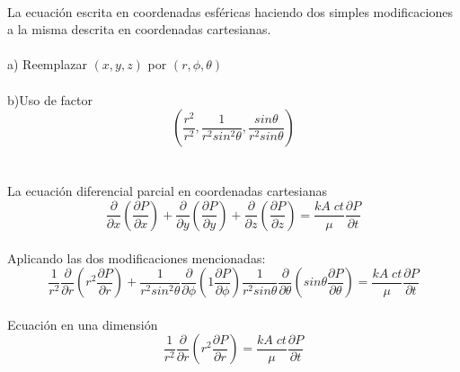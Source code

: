 \documentclass[10pt,a4paper]{report}
\begin{document}
\newpage
\ \\ La ecuación escrita en coordenadas esféricas haciendo dos simples modificaciones a la misma descrita en coordenadas cartesianas.
\\
\ \\ a) Reemplazar $(x,y,z)$ por $(r, \phi, \theta)$
\\
\ \\  b)Uso de factor 
\ \\ $$\displaystyle \left( \frac{r^2}{r^2} , \frac{1}{r^2 sin^2 \theta} , \frac{sin \theta}{r^2 sin \theta} \right)$$
\\\\ La ecuación diferencial parcial en coordenadas cartesianas 
\ \\ $$\displaystyle \frac{\partial}{\partial x} \left( \frac{\partial P}{\partial x } \right) +
\frac{\partial}{\partial y} \left( \frac{\partial P}{\partial y } \right) + 
\frac{\partial}{\partial z} \left( \frac{\partial P}{\partial z } \right) = \frac{k A \; ct}{\mu} \frac{\partial P}{\partial t}$$
\ \\ Aplicando las dos modificaciones mencionadas:
\ \\ $$ \displaystyle 
\frac{1}{r^2} \frac{\partial}{\partial r} \left( r^2 \frac{\partial P}{\partial r } \right) +
\frac{1}{r^2 sin^2 \theta} \frac{\partial}{\partial \phi} \left(1 \frac{\partial P}{\partial \phi } \right)
\frac{1}{r^2 sin \theta} \frac{\partial}{\partial \theta} \left(sin \theta \frac{\partial P}{\partial \theta } \right) = \frac{k A \; ct}{\mu} \frac{\partial P}{\partial t}$$
\ \\ Ecuación en una dimensión 
\ \\ $$\displaystyle \frac{1}{r^2} \frac{\partial}{\partial r} \left( r^2 \frac{\partial P}{\partial r} \right) = \frac{k A \; ct}{\mu} \frac{\partial P}{\partial t}$$
\\
\end{document}
